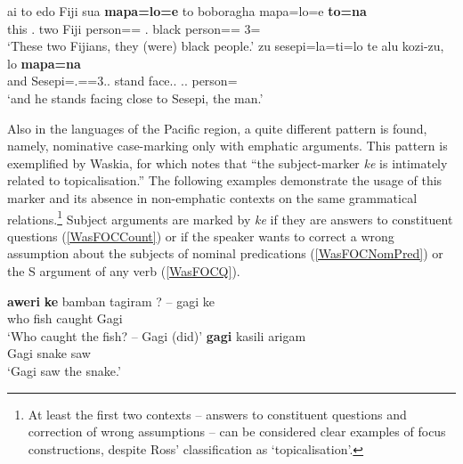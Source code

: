 \begin{exe}\ex{}
\begin{xlist}
\raggedright
\ex\label{SavEmphDoubSbj}\gll ai to edo Fiji sua \textbf{mapa=lo=e} to boboragha mapa=lo=e \textbf{to=na}\\
this \deter{}.\du{} two Fiji \att{} person=\du{}=\emphat{} \deter{}.\du{} black person=\du{}=\emphat{} 3\du{}=\nom{}\\
\glt `These two Fijians, they (were) black people.'
\ex\label{SavEmphAft}\gll zu sesepi=la=ti=lo te alu kozi-zu,  lo \textbf{mapa=na}\\
and Sesepi=\loc{}.\mas{}=\prox{}=3\sg{}.\mas{}.\nom{} \emphat{} stand face.\pst{}.\ipfv{} \deter{}.\sg{}.\mas{} person=\nom{}\\
\glt `and he stands facing close to Sesepi, the man.'%
\end{xlist} 
\end{exe}


Also in the languages of the Pacific region, a quite different pattern is found, namely, nominative case-marking only with emphatic arguments.
This pattern is exemplified by Waskia, for which \citet[36]{Ross:1978} notes that
``the subject-marker \emph{ke} is intimately related to topicalisation.''
The following examples demonstrate the usage of this marker and its absence in non-emphatic contexts on the same grammatical relations.\footnote{At least the first two contexts -- answers to constituent questions and correction of wrong assumptions -- can be considered clear examples of focus constructions, despite Ross' classification as `topicalisation'.}
Subject arguments are marked by \emph{ke} if they are answers to constituent questions (\ref{WasFOCCount}) or if the speaker wants to correct a wrong assumption about the subjects of nominal predications (\ref{WasFOCNomPred}) or the S argument of any verb (\ref{WasFOCQ}).

\begin{exe}\ex\label{WasFOCCount}
\begin{xlist}
\ex\gll \textbf{aweri} \textbf{ke} bamban tagiram ? \quad -- gagi ke\\
who \nom{} fish caught {} \quad {} Gagi \nom{}\\
\glt `Who caught the fish? \quad -- Gagi (did)'
\ex\gll \textbf{gagi} kasili arigam\\
Gagi snake saw\\
\glt `Gagi saw the snake.' %
\end{xlist}
\end{exe}


